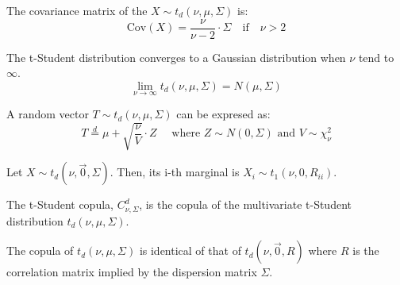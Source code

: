 \documentclass[11pt,fleqn]{book} %
\begin{document}
\begin{proposition}
	The covariance matrix of the $X \sim t_d(\nu,\mu,\Sigma)$ is:
	\begin{displaymath}
		\text{Cov}(X) = \frac{\nu}{\nu-2} \cdot \Sigma \quad \text{if} \quad \nu > 2
	\end{displaymath}
\end{proposition}

\begin{proposition}
	The t-Student distribution converges to a Gaussian distribution 
	when $\nu$ tend to $\infty$.
	\begin{displaymath}
		\lim_{\nu \to \infty} t_d(\nu,\mu,\Sigma) = N(\mu,\Sigma)
	\end{displaymath}
\end{proposition}

\begin{proposition}
	\label{prop:mtschar}
	A random vector $T \sim t_d(\nu,\mu,\Sigma)$ can be expresed as:
	\begin{displaymath}
		T \stackrel{d}{=} \mu + \sqrt{\frac{\nu}{V}}\cdot Z
		\quad \text{ where } Z \sim N(0,\Sigma) \text{ and } V \sim \chi_{\nu}^2
	\end{displaymath}
\end{proposition}

\begin{proposition}
	Let $X \sim t_d(\nu,\vec{0},\Sigma)$. Then, its i-th marginal is 
	$X_i \sim t_1(\nu,0,R_{ii})$.
\end{proposition}

\begin{definition}
	The t-Student copula, $C_{\nu,\Sigma}^d$, is the copula of the multivariate 
	t-Student distribution $t_d(\nu,\mu,\Sigma)$.
\end{definition}

\begin{proposition}
	The copula of $t_d(\nu,\mu,\Sigma)$ is identical of that of $t_d(\nu,\vec{0},R)$
	where $R$ is the correlation matrix implied by the dispersion matrix $\Sigma$.
\end{proposition}
\end{document}
